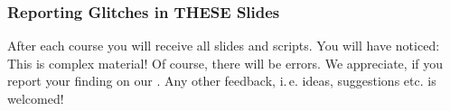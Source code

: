 \begin{frame}
	\frametitle{Reporting Glitches in THESE Slides}
	After each course you will receive all slides and scripts. You will have noticed: This is complex material! Of course, there will be errors. We appreciate, if you report your finding on our .\newline
	Any other feedback, i.\,e. ideas, suggestions etc. is welcomed! 
\end{frame}	
